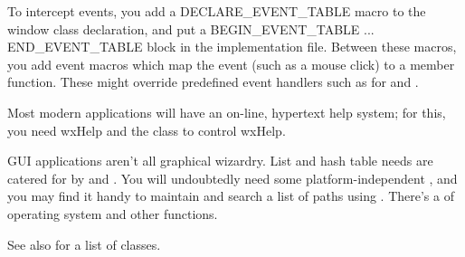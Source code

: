 To intercept events, you add a DECLARE\_EVENT\_TABLE macro to the window class declaration,
and put a BEGIN\_EVENT\_TABLE ... END\_EVENT\_TABLE block in the implementation file. Between these
macros, you add event macros which map the event (such as a mouse click) to a member function.
These might override predefined event handlers such as for  and
\rtfsp{}.

Most modern applications will have an on-line, hypertext help system; for this, you
need wxHelp and the  class to control
wxHelp.

GUI applications aren't all graphical wizardry. List and hash table needs are
catered for by  and .
You will undoubtedly need some platform-independent ,
and you may find it handy to maintain and search a list of paths using .
There's a  of operating system and other functions.

See also  for a list of classes.

